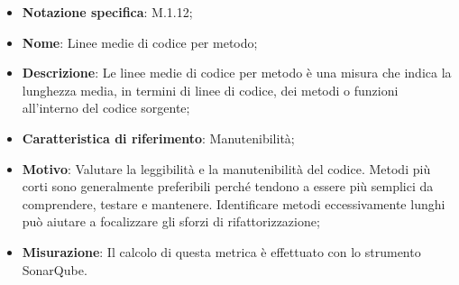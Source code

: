 \begin{itemize}
    \item \textbf{Notazione specifica}: M.1.12;
    \item \textbf{Nome}: Linee medie di codice per metodo;
    \item \textbf{Descrizione}: Le linee medie di codice per metodo è una misura che indica la lunghezza media, in termini di linee di codice, dei metodi o funzioni all'interno del codice sorgente;
    \item \textbf{Caratteristica di riferimento}: Manutenibilità;
    \item \textbf{Motivo}: Valutare la leggibilità e la manutenibilità del codice. Metodi più corti sono generalmente preferibili perché tendono a essere più semplici da comprendere, testare e mantenere. Identificare metodi eccessivamente lunghi può aiutare a focalizzare gli sforzi di rifattorizzazione;
    \item \textbf{Misurazione}: Il calcolo di questa metrica è effettuato con lo strumento SonarQube.
\end{itemize}
